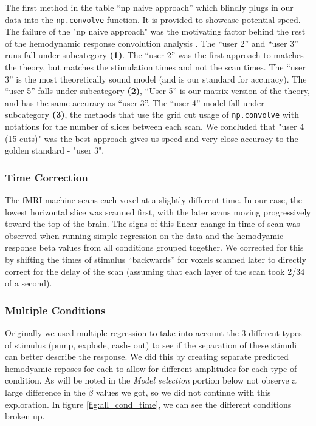 \par \noindent The first method in the table ``np naive approach'' which blindly plugs in our data 
into the \texttt{np.convolve} function. It is provided to showcase potential speed. 
The failure of the "np naive approach" was the motivating factor behind the rest 
of the hemodynamic response convolution analysis . The ``user 2'' and ``user 3'' 
runs fall under subcategory \textbf{(1)}. The ``user 2'' was the first approach to
matches the theory, but matches the stimulation times and not the scan times.
The ``user 3'' is the most theoretically sound model (and is our standard for 
accuracy). The ``user 5'' falls under subcategory \textbf{(2)}, ``User 5''  is our 
matrix version of the theory, and has the same accuracy as ``user 3''. The 
``user 4'' model fall under subcategory \textbf{(3)}, the methods that use the 
grid cut usage of \texttt{np.convolve} with notations for the number of slices 
between each scan. We concluded that "user 4 (15 cuts)" was the best approach 
gives us speed and very close accuracy to the golden standard - "user 3".

\subsubsection{Time Correction}

\par \indent The fMRI machine scans each voxel at a slightly different time. In our case, 
the lowest horizontal slice was scanned first, with the later scans moving 
progressively toward the top of the brain. The signs of this linear change 
in time of scan was observed when running simple regression on the data 
and the hemodyamic response beta values from all conditions grouped together.
We corrected for this  by shifting the times of stimulus ``backwards'' for voxels 
scanned later to directly correct for the delay of the scan (assuming that each 
layer of the scan took 2/34 of a second).

\subsubsection{Multiple Conditions}

\par \indent Originally we used multiple regression to take into account the 3 
different types of stimulus (pump, explode, cash- out) to see if the separation of 
these stimuli can better describe the response. We did this by creating separate 
predicted hemodyamic reposes for each to allow for different amplitudes for each 
type of condition. As will be noted in the \textit{Model selection} portion below not 
observe a large difference in the $\hat{\beta}$ values we got, so we did not continue 
with this exploration. In figure \ref{fig:all_cond_time}, we can see the different 
conditions broken up. 


